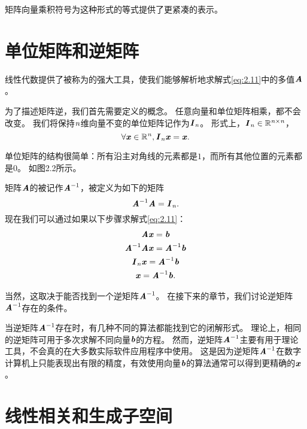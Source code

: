 矩阵向量乘积符号为这种形式的等式提供了更紧凑的表示。





\section{单位矩阵和逆矩阵}
\label{sec:identity_and_inverse_atrices}


线性代数提供了被称为的强大工具，使我们能够解析地求解式\ref{eq:2.11}中的多值$\MA$。


为了描述矩阵逆，我们首先需要定义的概念。
任意向量和单位矩阵相乘，都不会改变。
我们将保持$\Sn$维向量不变的单位矩阵记作为$\MI_{\Sn}$。
形式上，$\MI_{\Sn}\in \SetR^{\Sn\times \Sn}$，
\begin{equation}
    \forall \Vx \in \SetR^{\Sn}, \MI_{\Sn} \Vx = \Vx.
\end{equation}


单位矩阵的结构很简单：所有沿主对角线的元素都是$1$，而所有其他位置的元素都是$0$。
如图2.2所示。


矩阵$\MA$的被记作$\MA^{-1}$，被定义为如下的矩阵
\begin{equation} \MA^{-1}\MA = \MI_{\Sn}. \end{equation}
现在我们可以通过如果以下步骤求解式\ref{eq:2.11}：
\begin{gather}
\MA\Vx=\Vb \\
\MA^{-1}\MA\Vx = \MA^{-1}\Vb \\
\MI_{\Sn} \Vx=\MA^{-1}\Vb \\
\Vx=\MA^{-1}\Vb. 
\end{gather}


当然，这取决于能否找到一个逆矩阵$\MA^{-1}$。
在接下来的章节，我们讨论逆矩阵$\MA^{-1}$存在的条件。


当逆矩阵$\MA^{-1}$存在时，有几种不同的算法都能找到它的闭解形式。
理论上，相同的逆矩阵可用于多次求解不同向量$\Vb$的方程。
然而，逆矩阵$\MA^{-1}$主要有用于理论工具，不会真的在大多数实际软件应用程序中使用。
这是因为逆矩阵$\MA^{-1}$在数字计算机上只能表现出有限的精度，有效使用向量$\Vb$的算法通常可以得到更精确的$\Vx$。





\section{线性相关和生成子空间}
\label{sec:linear_dependence_and_span}

